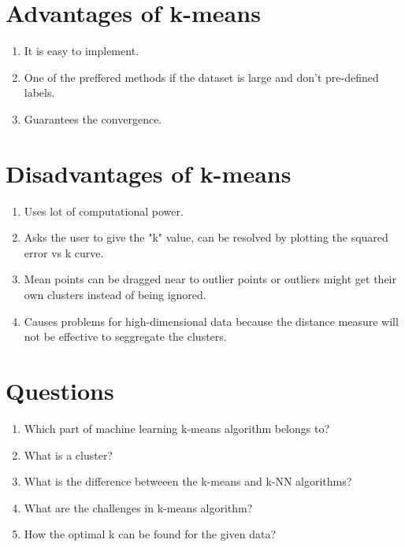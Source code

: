 \documentclass[journal,12pt,onecolumn]{IEEEtran}
\theoremstyle{remark}
\numberwithin{equation}{section}
\begin{document}
	     \section{Advantages of k-means}
		     \begin{enumerate}
		       \item It is easy to implement.
		       \item One of the preffered methods if the dataset is large and don't pre-defined labels.
		       \item Guarantees the convergence.
	             \end{enumerate}
	     \section{Disadvantages of k-means}
		      \begin{enumerate}
		       \item Uses lot of computational power.
		       \item Asks the user to give the "k" value, can be resolved by plotting the squared error vs k curve.
		       \item Mean points can be dragged near to outlier points or outliers might get their own clusters instead of being ignored.
		       \item Causes problems for high-dimensional data because the distance measure will not be effective to seggregate the clusters.
	              \end{enumerate}
	     \section{Questions}
		     \begin{enumerate}
		       \item Which part of machine learning k-means algorithm belongs to?
		       \item What is a cluster?
		       \item What is the difference betweeen the k-means and k-NN algorithms?
		       \item What are the challenges in k-means algorithm?
		       \item How the optimal k can be found for the given data?
	              \end{enumerate}
\end{document}
